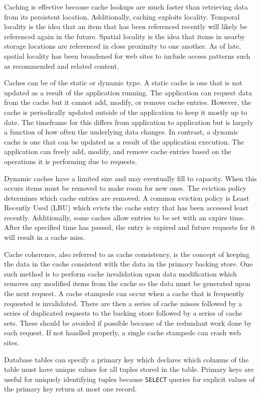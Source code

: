 \documentclass[12pt]{ucthesis}
\begin{document}
Caching is effective because cache lookups are much faster than retrieving data from its persistent location.
Additionally, caching exploits locality.
Temporal locality is the idea that an item that has been referenced recently will likely be referenced again in the future.
Spatial locality is the idea that items in nearby storage locations are referenced in close proximity to one another.
As of late, spatial locality has been broadened for web sites to include access patterns such as recommended and related content.

Caches can be of the static or dynamic type.
A static cache is one that is not updated as a result of the application running.
The application can request data from the cache but it cannot add, modify, or remove cache entries.
However, the cache is periodically updated outside of the application to keep it mostly up to date.
The timeframe for this differs from application to application but is largely a function of how often the underlying data changes.
In contrast, a dynamic cache is one that can be updated as a result of the application execution.
The application can freely add, modify, and remove cache entries based on the operations it is performing due to requests.

Dynamic caches have a limited size and may eventually fill to capacity.
When this occurs items must be removed to make room for new ones.
The eviction policy determines which cache entries are removed.
A common eviction policy is Least Recently Used (LRU) which evicts the cache entry that has been accessed least recently.
Additionally, some caches allow entries to be set with an expire time.
After the specified time has passed, the entry is expired and future requests for it will result in a cache miss.

Cache coherence, also referred to as cache consistency, is the concept of keeping the data in the cache consistent with the data in the primary backing store.
One such method is to perform cache invalidation upon data modification which removes any modified items from the cache so the data must be generated upon the next request.
A cache stampede can occur when a cache that is frequently requested is invalidated.
There are then a series of cache misses followed by a series of duplicated requests to the backing store followed by a series of cache sets.
These should be avoided if possible because of the redundant work done by each request.
If not handled properly, a single cache stampede can crash web sites.

Database tables can specify a primary key which declares which columns of the table must have unique values for all tuples stored in the table.
Primary keys are useful for uniquely identifying tuples because {\tt SELECT} queries for explicit values of the primary key return at most one record.
\end{document}
